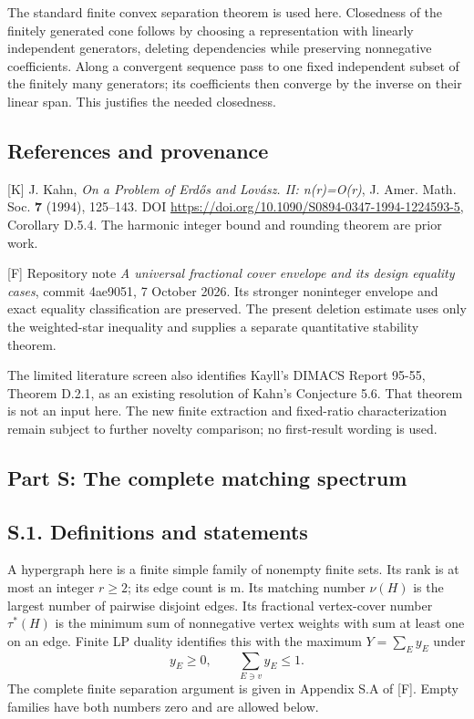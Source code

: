 \documentclass[
  11pt,
]{article}
\begin{document}
The standard finite convex separation theorem is used here. Closedness
of the finitely generated cone follows by choosing a representation with
linearly independent generators, deleting dependencies while preserving
nonnegative coefficients. Along a convergent sequence pass to one fixed
independent subset of the finitely many generators; its coefficients
then converge by the inverse on their linear span. This justifies the
needed closedness.

\subsection{References and
provenance}\label{references-and-provenance-1}

{[}K{]} J. Kahn, \emph{On a Problem of Erdős and Lovász. II: n(r)=O(r)},
J. Amer. Math. Soc. \textbf{7} (1994), 125--143. DOI
\url{https://doi.org/10.1090/S0894-0347-1994-1224593-5}, Corollary
D.5.4. The harmonic integer bound and rounding theorem are prior work.

{[}F{]} Repository note \emph{A universal fractional cover envelope and
its design equality cases}, commit 4ae9051, 7 October 2026. Its stronger
noninteger envelope and exact equality classification are preserved. The
present deletion estimate uses only the weighted-star inequality and
supplies a separate quantitative stability theorem.

The limited literature screen also identifies Kayll's DIMACS Report
95-55, Theorem D.2.1, as an existing resolution of Kahn's Conjecture
5.6. That theorem is not an input here. The new finite extraction and
fixed-ratio characterization remain subject to further novelty
comparison; no first-result wording is used.

\subsection{Part S: The complete matching
spectrum}\label{part-s-the-complete-matching-spectrum}

\subsection{S.1. Definitions and
statements}\label{s.1.-definitions-and-statements}

A hypergraph here is a finite simple family of nonempty finite sets. Its
rank is at most an integer \(r\ge2\); its edge count is m. Its matching
number \(\nu(H)\) is the largest number of pairwise disjoint edges. Its
fractional vertex-cover number \(\tau^*(H)\) is the minimum sum of
nonnegative vertex weights with sum at least one on an edge. Finite LP
duality identifies this with the maximum \(Y=\sum_E y_E\) under \[
             y_E\ge0,\qquad \sum_{E\ni v}y_E\le1.           \tag{S.1}
\] The complete finite separation argument is given in Appendix S.A of
{[}F{]}. Empty families have both numbers zero and are allowed below.
\end{document}
